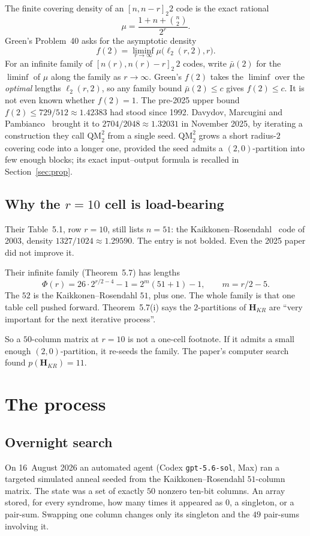 \documentclass[11pt,a4paper]{article}
\newcommand{\HH}{\boldsymbol{H}}
\newcommand{\ellr}{\ell_2}
\begin{document}
The finite covering density of an $[n,n-r]_2 2$ code is the exact rational
\[
\mu=\frac{1+n+\binom{n}{2}}{2^r}.
\]
Green's Problem~40 asks for the asymptotic density
\[
f(2)=\liminf_{r\to\infty}\mu\bigl(\ellr(r,2),r\bigr).
\]
For an infinite family of $[n(r),n(r)-r]_2\,2$ codes, write $\bar\mu(2)$
for the $\liminf$ of $\mu$ along the family as $r\to\infty$. Green's
$f(2)$ takes the $\liminf$ over the \emph{optimal} lengths $\ellr(r,2)$,
so any family bound $\bar\mu(2)\le c$ gives $f(2)\le c$.
It is not even known whether $f(2)=1$. The pre-2025 upper bound
$f(2)\le 729/512\approx 1.42383$ had stood since 1992. Davydov, Marcugini
and Pambianco~\cite{DMP2025} brought it to $2704/2048\approx 1.32031$ in
November 2025, by iterating a construction they call $\mathrm{QM}_2^2$
from a single seed. $\mathrm{QM}_2^2$ grows a short radius-$2$ covering
code into a longer one, provided the seed admits a $(2,0)$-partition into
few enough blocks; its exact input--output formula is recalled in
Section~\ref{sec:prop}.

\subsection{Why the $r=10$ cell is load-bearing}

Their Table~5.1, row $r=10$, still lists $n=51$: the
Kaikkonen--Rosendahl~\cite{KR2003} code of 2003, density
$1327/1024\approx 1.29590$. The entry is not bolded. Even the 2025 paper
did not improve it.

Their infinite family (Theorem~5.7) has lengths
\[
\Phi(r)=26\cdot 2^{r/2-4}-1=2^m(51+1)-1,\qquad m=r/2-5.
\]
The $52$ is the Kaikkonen--Rosendahl $51$, plus one. The whole family is
that one table cell pushed forward. Theorem~5.7(i) says the $2$-partitions
of $\HH_{KR}$ are ``very important for the next iterative process''.

So a $50$-column matrix at $r=10$ is not a one-cell footnote. If it admits
a small enough $(2,0)$-partition, it re-seeds the family. The paper's
computer search found $p(\HH_{KR})=11$.

\section{The process}

\subsection{Overnight search}

On 16~August 2026 an automated agent (Codex \texttt{gpt-5.6-sol}, Max)
ran a targeted simulated anneal seeded from the Kaikkonen--Rosendahl
$51$-column matrix. The state was a set of exactly $50$ nonzero ten-bit
columns. An array stored, for every syndrome, how many times it appeared
as $0$, a singleton, or a pair-sum. Swapping one column changes only its
singleton and the $49$ pair-sums involving it.
\end{document}
